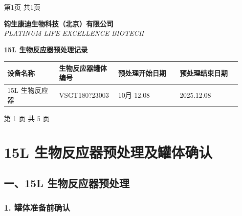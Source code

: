 \documentclass[UTF8,10pt,a4paper,fontset=fandol]{ctexart}
\newcommand{\fieldvalue}[1]{#1}
\newcommand{\handwritten}[1]{#1}
\begin{document}
\begin{center}
第1页 共1页
\end{center}

\newpage

\begin{center}
\small
\textbf{钧生康迪生物科技（北京）有限公司}\\
\textit{PLATINUM LIFE EXCELLENCE BIOTECH}

\vspace{1.2cm}

{\LARGE \textbf{15L 生物反应器预处理记录}}

\vspace{7.5cm}

\begin{tabular}{|p{0.21\linewidth}|p{0.24\linewidth}|p{0.25\linewidth}|p{0.25\linewidth}|}
\hline
设备名称 & 生物反应器罐体编号 & 预处理开始日期 & 预处理结束日期\\
\hline
\fieldvalue{15L 生物反应器}
&
\fieldvalue{\handwritten{VSGT180?23003}}
&
\fieldvalue{\handwritten{10月-12.08}}
&
\fieldvalue{\handwritten{2025.12.08}}
\\
\hline
\end{tabular}
\end{center}

\vfill

\begin{center}
第 1 页 共 5 页
\end{center}

\newpage

\section{15L 生物反应器预处理及罐体确认}

\subsection{一、15L 生物反应器预处理}

\subsubsection{1. 罐体准备前确认}
\end{document}
